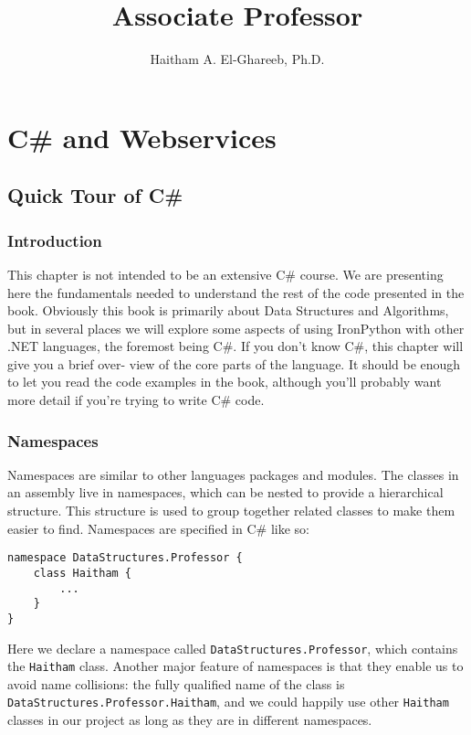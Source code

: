 \documentclass[12pt,a4paper,final,twoside,onecolumn,titlepage]{book}
\author{Haitham A. El-Ghareeb, Ph.D.}
\title{Associate Professor}
\begin{document}
\cleardoublepage
{}
\tableofcontents

\chapter{C\# and Webservices}
\section{Quick Tour of C\#}
\subsection{Introduction}
This chapter is not intended to be an extensive C\# course. We are presenting here the fundamentals needed to understand the rest of the code presented in the book. Obviously this book is primarily about Data Structures and Algorithms, but in several places we will explore some aspects of using IronPython with other .NET languages, the foremost being C\#. If you don’t know C\#, this chapter will give you a brief over- view of the core parts of the language. It should be enough to let you read the code examples in the book, although you’ll probably want more detail if you’re trying to write C\# code.
\subsection{Namespaces}
Namespaces are similar to other languages packages and modules. The classes in an assembly live in namespaces, which can be nested to provide a hierarchical structure. This structure is used to group together related classes to make them easier to find. Namespaces are specified in C\# like so:
\lstset{language=csh, tabsize=4}
\begin{lstlisting}
namespace DataStructures.Professor { 
	class Haitham { 
		... 
	}
}
\end{lstlisting}
Here we declare a namespace called \texttt{DataStructures.Professor}, which contains the \texttt{Haitham} class. Another major feature of namespaces is that they enable us to avoid name collisions: the fully qualified name of the class is \texttt{DataStructures.Professor.Haitham}, and we could happily use other \texttt{Haitham} classes in our project as long as they are in different namespaces.
\end{document}

